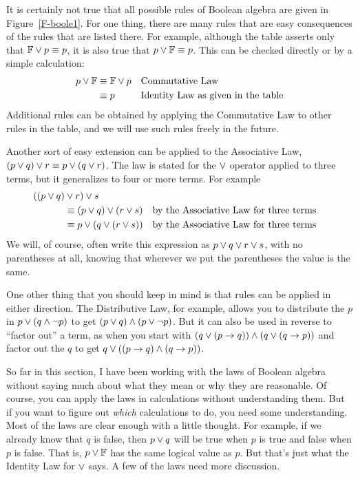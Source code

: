 \medbreak

It is certainly not true that all possible rules of Boolean algebra are given
in Figure~\ref{F-boole1}.  For one thing, there are many rules that are easy
consequences of the rules that are listed there.  For example, although the
table asserts only that $\mathbb{F}\vee p\equiv p$, it is also true that
$p\vee\mathbb{F}\equiv p$.  This can be checked directly or by a simple calculation:
\begin{align*}
p\vee\mathbb{F} &\equiv \mathbb{F}\vee p &&\text{Commutative Law}\\
        &\equiv p        &&\text{Identity Law as given in the table}\\
\end{align*}
Additional rules can be obtained by applying the Commutative Law to other
rules in the table, and we will use such rules freely in the future.

Another sort of easy extension can be applied to the Associative Law,
$(p\vee q)\vee r\equiv p\vee(q\vee r)$. The law is stated for the $\vee$ operator
applied to three terms, but it generalizes to four or more terms. For example
\begin{align*}
((p\vee q)&\vee r)\vee s\\
     &\equiv (p\vee q)\vee (r\vee s) &&\text{by the Associative Law for three terms}\\
     &\equiv p\vee(q\vee (r\vee s))  &&\text{by the Associative Law for three terms}\\
\end{align*}
We will, of course, often write this expression as $p\vee q\vee r\vee s$, with no
parentheses at all, knowing that wherever we put the parentheses the value is the
same.

One other thing that you should keep in mind is that rules can be applied in
either direction.  The Distributive Law, for example, allows you to
distribute the $p$ in $p\vee(q\wedge\lnot p)$ to get $(p\vee q)\wedge(p\vee\lnot p)$.
But it can also be used in reverse to ``factor out'' a term, as when you
start with $(q\vee(p\rightarrow q))\wedge(q\vee(q\rightarrow p))$ and factor out the $q$
to get $q\vee((p\rightarrow q)\wedge(q\rightarrow p))$.


\medbreak

So far in this section, I have been working with the laws of Boolean
algebra without saying much about what they mean or why they are
reasonable.  Of course, you can apply the laws in calculations without
understanding them.  But if you want to figure out \emph{which}
calculations to do, you need some understanding.  Most of the laws
are clear enough with a little thought.  For example, if we already
know that $q$ is false, then $p\vee q$ will be true when $p$ is true
and false when $p$ is false.  That is, $p\vee\mathbb{F}$ has the same logical
value as $p$.  But that's just what the Identity Law for $\vee$ says.
A few of the laws need more discussion.

